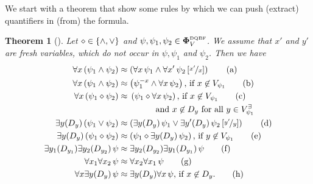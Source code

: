 \documentclass[
  digital, %
  twoside, %
  table,   %
  nolof,     %
  nolot,     %
]{fithesis3}
\let\setbuilder\set
\newcommand{\simpleset}[1]{\{{#1}\}}
\renewcommand{\set}[1]{\normalexpandarg\IfSubStr{#1}{|}{\setbuilder{#1}}{\simpleset{#1}}}
\newtheorem{theorem}{Theorem}[chapter] %
\theoremstyle{definition}
\theoremstyle{remark}
\newcommand{\substitute}[2]{\left[ \nicefrac{#2}{#1} \right]}
\newcommand{\DQBF}[1]{\mathbf{\Phi}_{#1}^{\normalfont{\text{\tiny DQBF}}}}
\newcommand{\evars}[1]{V_{#1}^{\exists}}
\newcommand{\itholds}{\,}
\begin{document}
We start with a theorem that show some rules by which we can push (extract) quantifiers in (from) the formula. %

\begin{theorem}[{\cite[Theorems 3,4]{HQSquantifierLocalization}}]
\label{thrm:quantLocalEq}
  Let ${\diamond} \in \set{{\land},{\lor}}$ and $\psi,\psi_1,\psi_2 \in \DQBF{V}$. We assume that $x'$ and $y'$ are fresh variables, which do not occur in $\psi,\psi_1$ and $\psi_2$. Then we have
  \begin{align}
      \forall x \itholds (\psi_1 \land \psi_2) &\approx \left(\forall x \itholds \psi_1 \land \forall x' \itholds \psi_2\substitute{x}{x'}\right) \tag{a} \label{loc:unconj1} \\
      \forall x \itholds (\psi_1 \land \psi_2) &\approx \left(\psi_1^{-x} \land \forall x \itholds \psi_2\right) \text{, if } x \not\in V_{\psi_1} \tag{b} \label{loc:unconj2} \\
      \forall x \itholds (\psi_1 \diamond \psi_2) &\approx \begin{multlined}[t][3cm]\left(\psi_1 \diamond \forall x \itholds \psi_2\right) \text{, if } x \not\in V_{\psi_1} \tag{c} \label{loc:undisj} \\
      \text{ and } x \not\in D_y \text{ for all } y \in \evars{\psi_1}\end{multlined} \\
      \exists y(D_y) \itholds (\psi_1 \lor \psi_2) &\approx \left(\exists y(D_y) \itholds \psi_1 \lor \exists y'(D_y) \itholds \psi_2\substitute{y}{y'}\right) \tag{d} \label{loc:exdisj} \\
      \exists y(D_y) \itholds (\psi_1 \diamond \psi_2) &\approx \left(\psi_1 \diamond \exists y(D_y) \itholds \psi_2\right) \text{, if } y \not\in V_{\psi_1} \tag{e} \label{loc:exboth} \\
      \exists y_1(D_{y_1})\exists y_2(D_{y_2}) \itholds \psi &\approx \exists y_2(D_{y_2}) \exists y_1(D_{y_1}) \itholds \psi \tag{f} \label{loc:exswap} \\
      \forall x_1\forall x_2 \itholds \psi &\approx \forall x_2\forall x_1 \itholds \psi \tag{g} \label{loc:unswap} \\
      \forall x\exists y(D_y) \itholds \psi &\approx \exists y(D_y)\forall x \itholds \psi\text{, if } x \not\in D_y. \tag{h} \label{loc:bothswap}
  \end{align}
\end{theorem}
\end{document}
